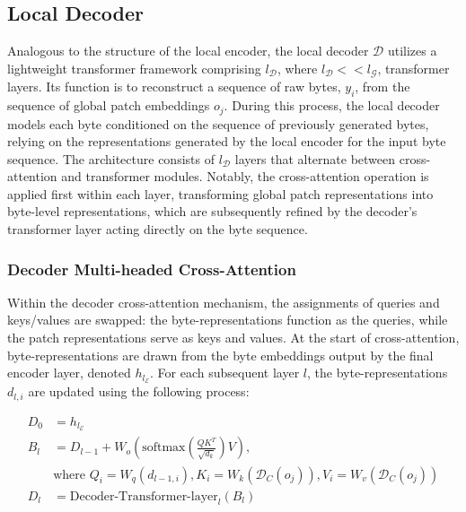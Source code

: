 \subsection{Local Decoder} 

Analogous to the structure of the local encoder, the local decoder $\mathcal{D}$ utilizes a lightweight transformer framework comprising $l_{\mathcal{D}}$, where $l_{\mathcal{D}} << l_{\mathcal{G}}$, transformer layers. Its function is to reconstruct a sequence of raw bytes, $y_i$, from the sequence of global patch embeddings $o_j$. During this process, the local decoder models each byte conditioned on the sequence of previously generated bytes, relying on the representations generated by the local encoder for the input byte sequence. The architecture consists of $l_{\mathcal{D}}$ layers that alternate between cross-attention and transformer modules. Notably, the cross-attention operation is applied first within each layer, transforming global patch representations into byte-level representations, which are subsequently refined by the decoder's transformer layer acting directly on the byte sequence.

\subsubsection{Decoder Multi-headed Cross-Attention} 

Within the decoder cross-attention mechanism, the assignments of queries and keys/values are swapped: the byte-representations function as the queries, while the patch representations serve as keys and values. At the start of cross-attention, byte-representations are drawn from the byte embeddings output by the final encoder layer, denoted $h_{l_{\mathcal{E}}}$. For each subsequent layer $l$, the byte-representations $d_{l,i}$ are updated using the following process:

\begin{align}
D_0 &= h_{l_{\mathcal{E}}} \\
B_l &= D_{l-1} + W_o\left(\text{softmax}\left(\frac{QK^T}{\sqrt{d_k}}\right)V\right), \\
  &\text{where } Q_i = W_q(d_{l-1,i}), K_i = W_k(\mathcal{D}_C(o_j)), V_i = W_v(\mathcal{D}_C(o_j)) \\
  D_l &= \text{Decoder-Transformer-layer}_l(B_l)
\end{align}

